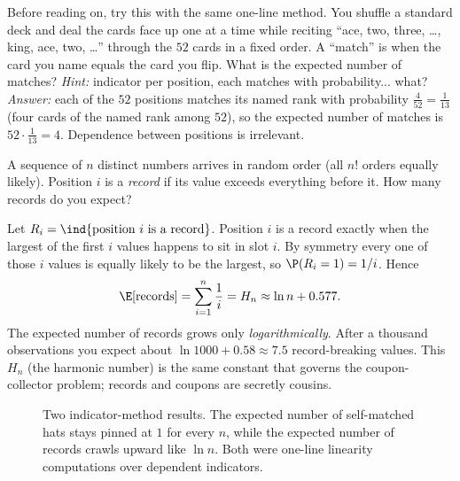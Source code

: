 \begin{labbox}
Before reading on, try this with the same one-line method. You shuffle a standard
deck and deal the cards face up one at a time while reciting ``ace, two, three,
\dots, king, ace, two, \dots'' through the $52$ cards in a fixed order. A
``match'' is when the card you name equals the card you flip. What is the expected
number of matches? \emph{Hint:} indicator per position, each matches with
probability... what? \\[2pt]
\emph{Answer:} each of the $52$ positions matches its named rank with probability
$\tfrac{4}{52}=\tfrac1{13}$ (four cards of the named rank among $52$), so the
expected number of matches is $52\cdot\tfrac1{13} = 4$. Dependence between
positions is irrelevant.
\end{labbox}

\begin{example}
\label{ch08:ex-records}
A sequence of $n$ distinct numbers arrives in random order (all $n!$ orders
equally likely). Position $i$ is a \emph{record} if its value exceeds everything
before it. How many records do you expect?

Let $R_i = \ind\{\text{position } i \text{ is a record}\}$. Position $i$ is a
record exactly when the largest of the first $i$ values happens to sit in slot
$i$. By symmetry every one of those $i$ values is equally likely to be the
largest, so $\P(R_i = 1) = 1/i$. Hence
\[
  \E[\text{records}] = \sum_{i=1}^n \frac1i = H_n \approx \ln n + 0.577.
\]
The expected number of records grows only \emph{logarithmically}. After a
thousand observations you expect about $\ln 1000 + 0.58 \approx 7.5$ record-breaking
values. This $H_n$ (the harmonic number) is the same constant that governs the
coupon-collector problem; records and coupons are secretly cousins.
\end{example}

\begin{figure}[H]
\centering
{}
\caption{Two indicator-method results. The expected number of self-matched hats
stays pinned at $1$ for every $n$, while the expected number of records crawls
upward like $\ln n$. Both were one-line linearity computations over dependent
indicators.}
\label{ch08:fig-hats-records}
\end{figure}

